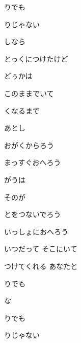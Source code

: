 \documentclass[14pt]{ltjsarticle}
\begin{document}
{\item
  りでも
  \jisho{}

  りじゃない
  \jisho{}

\item
  しなら
  \jisho{}

  とっくにつけたけど
  \jisho{}

  どぅかは
  \jisho{}

  このままでいて
  \jisho{}

  くなるまで
  \jisho{}

  あとし
  \jisho{}

\item
  おがくからろう
  \jisho{}

  まっすぐおへろう
  \jisho{}

  がうは
  \jisho{}

  そのが
  \jisho{}

\item
  とをつないでろう
  \jisho{}

  いっしょにおへろう
  \jisho{}

  いつだって そこにいて
  \jisho{}

  つけてくれる あなたと
  \jisho{}

  りでも
  \jisho{}

  な
  \jisho{}

\item
  りでも
  \jisho{}

  りじゃない
  \jisho{}

  
}
\end{document}
